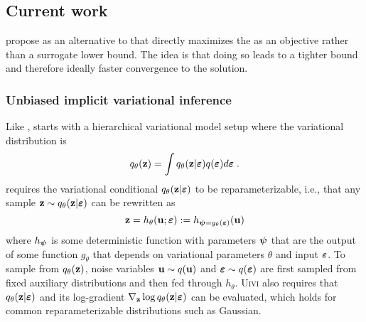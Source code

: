 \documentclass[10pt]{article}
\begin{document}
\subsection{Current work} \label{an:uivi}

\citet{Titsias:2019} propose \uivi as an alternative to \sivi that directly maximizes the \elbo as an objective rather than a surrogate lower bound. The idea is that doing so leads to a tighter \elbo bound and therefore ideally faster convergence to the solution.

\subsubsection{Unbiased implicit variational inference}

Like \sivi, \uivi starts with a hierarchical variational model setup where the variational distribution is
\[
q_\theta(\mathbf{z}) = \int q_\theta(\mathbf{z}|\bm{\varepsilon})q(\bm{\varepsilon})d\bm{\varepsilon} \;.
\]
\uivi requires the variational conditional $q_\theta(\mathbf{z}|\bm{\varepsilon})$ to be reparameterizable, i.e., that any sample $\mathbf{z}\sim q_\theta(\mathbf{z}|\bm{\varepsilon})$ can be rewritten as
\[
\mathbf{z} = h_\theta(\mathbf{u};\bm{\varepsilon}) := h_{\bm{\psi}=g_\theta(\bm{\varepsilon})}(\mathbf{u}) 
\]
where $h_{\bm{\psi}}$ is some deterministic function with parameters $\bm{\psi}$ that are the output of some function $g_\theta$ that depends on variational parameters $\theta$ and input $\bm{\varepsilon}$. To sample from $q_\theta(\mathbf{z})$, noise variables $\mathbf{u}\sim q(\mathbf{u})$ and $\bm{\varepsilon}\sim q(\bm{\varepsilon})$ are first sampled from fixed auxiliary distributions and then fed through $h_\theta$. \textsc{Uivi} also requires that $q_\theta(\mathbf{z}|\bm{\varepsilon})$ and its log-gradient $\nabla_{\mathbf{z}}\log q_\theta(\mathbf{z}|\bm{\varepsilon})$ can be evaluated, which holds for common reparameterizable distributions such as Gaussian.
\\
\end{document}
